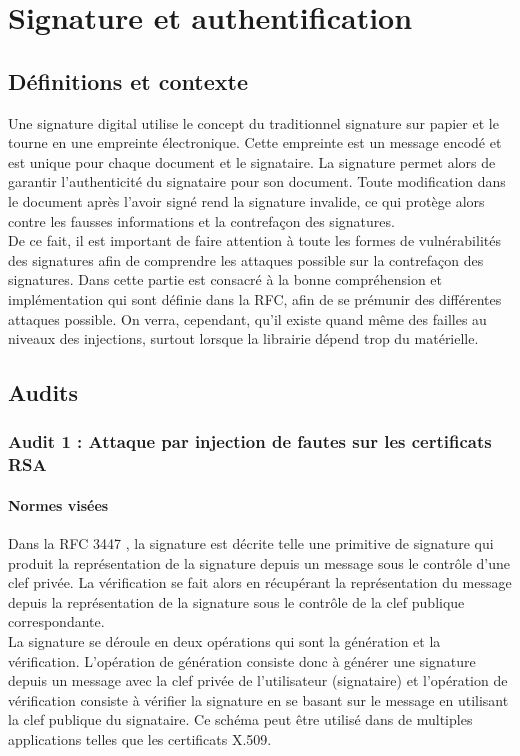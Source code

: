 \chapter{Signature et authentification}
\section{Définitions et contexte}

Une signature digital utilise le concept du traditionnel signature sur papier et le tourne en une empreinte électronique. Cette empreinte est un message encodé et est unique pour chaque document et le signataire. La signature permet alors de garantir l'authenticité du signataire pour son document. Toute modification dans le document après l'avoir signé rend la signature invalide, ce qui protège alors contre les fausses informations et la contrefaçon des signatures.\\

De ce fait, il est important de faire attention à toute les formes de vulnérabilités des signatures afin de comprendre les attaques possible sur la contrefaçon des signatures. Dans cette partie est consacré à la bonne compréhension et implémentation qui sont définie dans la RFC, afin de se prémunir des différentes attaques possible. On verra, cependant, qu'il existe quand même des failles au niveaux des injections, surtout lorsque la librairie dépend trop du matérielle. 


\section{Audits}
	\subsection{Audit 1 : Attaque par injection de fautes sur les certificats RSA}
		\subsubsection{Normes visées}
Dans la RFC 3447 \cite{rfc3447}, la signature est décrite telle une primitive de signature qui produit la représentation de la signature depuis un message sous le contrôle d'une clef privée. La vérification se fait alors en récupérant la représentation du message depuis la représentation de la signature sous le contrôle de la clef publique correspondante.\\

La signature se déroule en  deux opérations qui sont la génération et la vérification. L'opération de génération consiste donc à générer une signature depuis un message avec la clef privée de l'utilisateur (signataire) et l'opération de vérification consiste à vérifier la signature en se basant sur le message en utilisant la clef publique du signataire. 
Ce schéma peut être utilisé dans de multiples applications telles que les certificats X.509.\\



